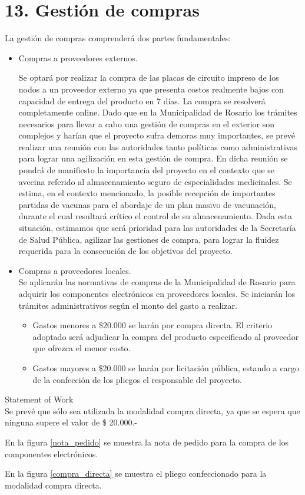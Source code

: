 \section{13. Gestión de compras}
\label{sec:compras}

La gestión de compras comprenderá dos partes fundamentales:
\begin{itemize}
\item Compras a proveedores externos.

Se optará por realizar la compra de las placas de circuito impreso de los nodos a un proveedor externo ya que presenta costos realmente bajos con capacidad de entrega del producto en 7 días. La compra se resolverá completamente online.
Dado que en la Municipalidad de Rosario los trámites necesarios para llevar a cabo una gestión de compras en el exterior son complejos y harían que el proyecto sufra demoras muy importantes, se prevé realizar una reunión con las autoridades tanto políticas como administrativas para lograr una agilización en esta gestión de compra. En dicha reunión se pondrá de manifiesto la importancia del proyecto en el contexto que se avecina referido al almacenamiento seguro de especialidades medicinales.
Se estima, en el contexto mencionado, la posible recepción de importantes partidas de vacunas para el abordaje de un plan masivo de vacunación, durante el cual resultará crítico el control de su almacenamiento.
Dada esta situación, estimamos que será prioridad para las autoridades de la Secretaría de Salud Pública, agilizar las gestiones de compra, para lograr la fluidez requerida para la consecución de los objetivos del proyecto.

\item Compras a proveedores locales.\\
Se aplicarán las normativas de compras de la Municipalidad de Rosario para adquirir los componentes electrónicos en proveedores locales. Se iniciarán los trámites administrativos según el monto del gasto a realizar.
\begin{itemize}
\item Gastos menores a \$20.000 se harán por compra directa. El criterio adoptado será adjudicar la compra del producto especificado al proveedor que ofrezca el menor costo.
\item Gastos mayores a \$20.000 se harán por licitación pública, estando a cargo de la confección de los pliegos el responsable del proyecto. 
\end{itemize}
\end{itemize}

Statement of Work\\
Se prevé que sólo sea utilizada la modalidad compra directa, ya que se espera que ninguna supere el valor de \$ 20.000.-

En la figura \ref{nota_pedido} se muestra la nota de pedido para la compra de los componentes electrónicos.

En la figura \ref{compra_directa} se muestra el pliego confeccionado para la modalidad compra directa.